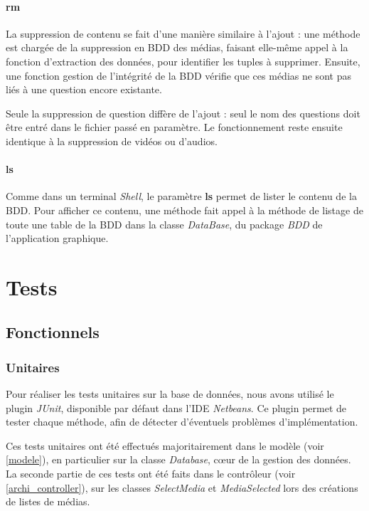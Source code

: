 \paragraph{rm}

La suppression de contenu se fait d'une manière similaire à l'ajout : une méthode est chargée de la suppression en BDD des médias, faisant elle-même appel à la fonction d'extraction des données, pour identifier les tuples à supprimer. Ensuite, une fonction gestion de l'intégrité de la BDD vérifie que ces médias ne sont pas liés à une question encore existante.

Seule la suppression de question diffère de l'ajout : seul le nom des questions doit être entré dans le fichier passé en paramètre. Le fonctionnement reste ensuite identique à la suppression de vidéos ou d'audios.

\paragraph{ls}

Comme dans un terminal \textit{Shell}, le paramètre \textbf{ls} permet de lister le contenu de la BDD. Pour afficher ce contenu, une méthode fait appel à la méthode de listage de toute une table de la BDD dans la classe \textit{DataBase}, du package \textit{BDD} de l'application graphique.

\section{Tests}\label{tests}

\subsection{Fonctionnels}

\subsubsection{Unitaires}

Pour réaliser les tests unitaires sur la base de données, nous avons utilisé le plugin \textit{JUnit}, disponible par défaut dans l'IDE \textit{Netbeans}.
Ce plugin permet de tester chaque méthode, afin de détecter d'éventuels problèmes d'implémentation.

Ces tests unitaires ont été effectués majoritairement dans le modèle (voir \ref{modele}), en particulier sur la classe \textit{Database}, cœur de la gestion des données. La seconde partie de ces tests ont été faits dans le contrôleur (voir \ref{archi_controller}), sur les classes \textit{SelectMedia} et \textit{MediaSelected} lors des créations de listes de médias.

